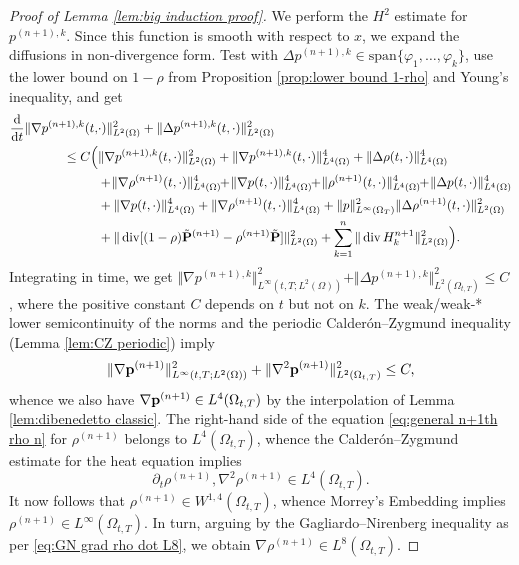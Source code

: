 \documentclass[11pt,a4paper,reqno]{amsart}
\theoremstyle{remark}
\theoremstyle{definition}
\numberwithin{equation}{section}
\DeclareMathOperator{\dv}{div}
\renewcommand{\span}{\mathrm{span}}
\renewcommand{\P}{{\bf P}}
\newcommand{\p}{{\bf p}}
\newcommand{\der}{\mathrm{d}}
\newcommand{\rr}[1]{\rho^{(#1)}}
\begin{document}
\begin{proof}[Proof of Lemma \ref{lem:big induction proof}]
We perform the $H^2$  estimate for $p^{(n+1),k}$. Since this function is smooth with respect to  $x$, we expand the diffusions in non-divergence form. Test with $\Delta p^{(n+1),k} \in \span\{\varphi_1,\dots,\varphi_k\}$, use the lower bound on $1\!-\!\rho$ from Proposition \ref{prop:lower bound 1-rho} and Young's inequality, and get 
\begin{equation*}
    \begin{aligned}
        \frac{\der}{\der t}\Vert \nabla p^{(n+1),k}(t,&\cdot) \Vert^2_{L^2(\Omega)} + \Vert \Delta p^{(n+1),k}(t,\cdot) \Vert^2_{L^2(\Omega)} \\ 
        \leq C \Big( &\Vert \nabla p^{(n+1),k}(t,\cdot) \Vert^2_{L^2(\Omega)} + \Vert \nabla p^{(n+1),k}(t,\cdot) \Vert^4_{L^4(\Omega)} + \Vert \Delta \rho (t,\cdot) \Vert^4_{L^4(\Omega)}  \\ 
        &+ \!\Vert \nabla \rho^{(n+1)}(t,\cdot) \Vert^4_{L^4(\Omega)} \!\!+\! \Vert \nabla p (t,\cdot) \Vert^4_{L^4(\Omega)} \!\!+\! \Vert  \rho^{(n+1)}(t,\cdot) \Vert^4_{L^4(\Omega)} \!\!+\! \Vert \Delta p (t,\cdot) \Vert^4_{L^4(\Omega)} \\ 
        &+ \Vert \nabla p(t,\cdot) \Vert^4_{L^4(\Omega)} + \Vert \nabla \rho^{(n+1)} (t,\cdot) \Vert^4_{L^4(\Omega)} + \Vert  p \Vert_{L^\infty(\Omega_T)}^2 \Vert \Delta \rho^{(n+1)} (t,\cdot) \Vert^2_{L^2(\Omega)} \\ 
        &+ \Vert \dv[
 (1- \rho) \tilde{\P}^{(n+1)} -\rr{n+1} \tilde{\P}
    ]\Vert^2_{L^2(\Omega)} + \sum_{k=1}^{n} \Vert \dv H^{n+1}_k\Vert^2_{L^2(\Omega)}\Big). 
    \end{aligned}
\end{equation*}
Integrating in time, we get $\Vert \nabla p^{(n+1),k} \Vert^2_{L^\infty(t,T;L^2(\Omega))} + \Vert \Delta p^{(n+1),k} \Vert^2_{L^2(\Omega_{t,T})} \leq C$, where the positive constant $C$ depends on $t$ but not on $k$. The weak/weak-* lower semicontinuity of the norms and the periodic Calder\'on--Zygmund inequality (Lemma \ref{lem:CZ periodic}) imply 
\begin{equation*}
    \begin{aligned}
        \Vert \nabla \p^{(n+1)} \Vert^2_{L^\infty(t,T;L^2(\Omega))} + \Vert \nabla^2 \p^{(n+1)} \Vert^2_{L^2(\Omega_{t,T})} \leq C , 
    \end{aligned}
\end{equation*}
whence we also have $\nabla \p^{(n+1)} \in L^4(\Omega_{t,T})$ by the interpolation  of Lemma \ref{lem:dibenedetto classic}. The right-hand side of the equation \eqref{eq:general n+1th rho n} for $\rho^{(n+1)}$ belongs to $L^4(\Omega_{t,T})$, whence the Calder\'on--Zygmund estimate for the heat equation implies 
\begin{equation*}
     \partial_t \rho^{(n+1)} , \nabla^2 \rho^{(n+1)} \in L^4(\Omega_{t,T}). 
\end{equation*}
It now follows that $\rho^{(n+1)} \in W^{1,4}(\Omega_{t,T})$, whence Morrey's Embedding implies $\rho^{(n+1)} \in L^\infty(\Omega_{t,T})$. In turn, arguing by the Gagliardo--Nirenberg inequality as per \eqref{eq:GN grad rho dot L8}, we obtain $\nabla \rho^{(n+1)} \in L^8(\Omega_{t,T})$. 


\end{proof}
\end{document}
